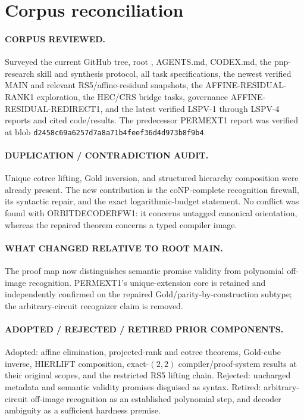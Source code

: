 \documentclass[11pt]{article}
\begin{document}
\section{Corpus reconciliation}
\paragraph{CORPUS REVIEWED.}
Surveyed the current GitHub tree, root , AGENTS.md, CODEX.md,
the pnp-research skill and synthesis protocol, all task specifications, the
newest verified MAIN and relevant RS5/affine-residual snapshots, the
AFFINE-RESIDUAL-RANK1 exploration, the HEC/CRS bridge tasks, governance
AFFINE-RESIDUAL-REDIRECT1, and the latest verified LSPV-1 through LSPV-4
reports and cited code/results.  The predecessor PERMEXT1 report was verified
at blob \texttt{d2458c69a6257d7a8a71b4feef36d4d973b8f9b4}.

\paragraph{DUPLICATION / CONTRADICTION AUDIT.}
Unique cotree lifting, Gold inversion, and structured hierarchy composition
were already present.  The new contribution is the coNP-complete recognition
firewall, its syntactic repair, and the exact logarithmic-budget statement.
No conflict was found with ORBITDECODERFW1: it concerns untagged canonical
orientation, whereas the repaired theorem concerns a typed compiler image.

\paragraph{WHAT CHANGED RELATIVE TO ROOT MAIN.}
The proof map now distinguishes semantic promise validity from polynomial
off-image recognition.  PERMEXT1's unique-extension core is retained and
independently confirmed on the repaired Gold/parity-by-construction subtype;
the arbitrary-circuit recognizer claim is removed.

\paragraph{ADOPTED / REJECTED / RETIRED PRIOR COMPONENTS.}
Adopted: affine elimination, projected-rank and cotree theorems, Gold-cube
inverse, HIERLIFT composition, exact-$(2,2)$ compiler/proof-system results at
their original scopes, and the restricted RS5 lifting chain.  Rejected:
uncharged metadata and semantic validity promises disguised as syntax.
Retired: arbitrary-circuit off-image recognition as an established
polynomial step, and decoder ambiguity as a sufficient hardness premise.
\end{document}
